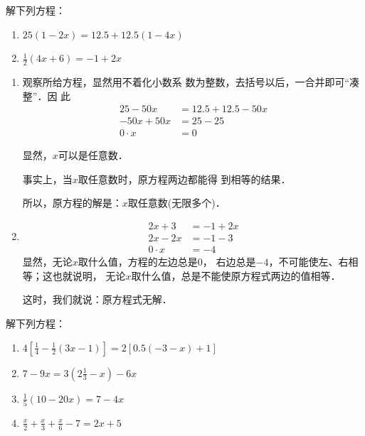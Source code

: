 \begin{example}
解下列方程：
\begin{enumerate}
    \item $25(1-2x)=12.5+12.5(1-4x)$
    \item $\frac{1}{2}(4x+6)=-1+2x$
\end{enumerate}
\end{example}

\begin{solution}
\begin{enumerate}
    \item     观察所给方程，显然用不着化小数系
    数为整数，去括号以后，一合并即可“凑整”．因
    此
    \begin{align*}
25-50x&=12.5+12.5-50x  \tag{去括号}\\
    -50x+50x&=25-25  \tag{移项}\\
    0\cdot x&=0 \tag{合并同类项}    
    \end{align*}
    
    显然，$x$可以是任意数．

    事实上，当$x$取任意数时，原方程两边都能得
到相等的结果．

    所以，原方程的解是：$x$取任意数(无限多个)．
    
\item     \begin{align*}
    2x+3&=-1+2x  \tag{去括号}\\
        2x-2x&=-1-3  \tag{移项}\\
        0\cdot x&=-4 \tag{合并同类项}    
        \end{align*}
        显然，无论$x$取什么值，方程的左边总是0，
    右边总是$-4$，不可能使左、右相等；这也就说明，
    无论$x$取什么值，总是不能使原方程式两边的值相等．

        这时，我们就说：原方程式无解．
\end{enumerate}    
\end{solution}

\begin{ex}
解下列方程：
\begin{enumerate}
    \item $4\left[\frac{1}{4}-\frac{1}{2}(3x-1)\right]=2[0.5(-3-x)+1]$
    \item $7-9x=3\left(2\frac{1}{3}-x\right)-6x$
    \item $\frac{1}{5}(10-20x)=7-4x$
    \item $\frac{x}{2}+\frac{x}{3}+\frac{x}{6}-7=2x+5$
\end{enumerate}
\end{ex}


